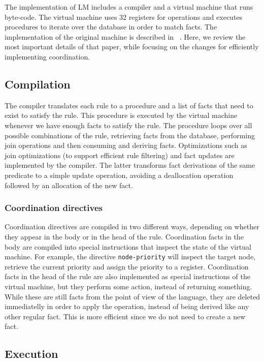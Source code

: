 The implementation of LM includes a compiler and a virtual machine that runs
byte-code. The virtual machine uses 32 registers for
operations and executes procedures to iterate over the database in order to match facts.
The implementation of the original machine is described in ~\cite{cruz-ppdp14}.
Here, we review the most important details of that paper, while focusing on the
changes for efficiently implementing coordination.

\subsection{Compilation}

The compiler translates each rule to a procedure and a list of facts that need
to exist to satisfy the rule. This procedure is executed by the virtual
machine whenever we have enough facts to satisfy the rule. The procedure
loops over all possible combinations of the rule, retrieving facts from the
database, performing join operations and then consuming and deriving facts.
Optimizations such as join optimizations (to support efficient rule filtering)
and fact updates are implemented by the compiler. The latter
transforms fact derivations of the same predicate to a simple update operation,
avoiding a deallocation operation followed by an allocation of the new fact.

\subsubsection{Coordination directives}

Coordination directives are compiled in two different ways, depending on whether they
appear in the body or in the head of the rule. Coordination facts in the body
are compiled into special instructions that inspect the state of the virtual
machine. For example, the directive \texttt{node-priority} will inspect the
target node, retrieve the current priority and assign the priority to a
register. Coordination facts in the head of the rule are also implemented as
special instructions of the virtual machine, but they perform some action,
instead of returning something. While these are still facts from the point of
view of the language, they are deleted immediatelly in order to apply the
operation, instead of being derived like any other regular fact. This is more
efficient since we do not need to create a new fact.

\subsection{Execution}

